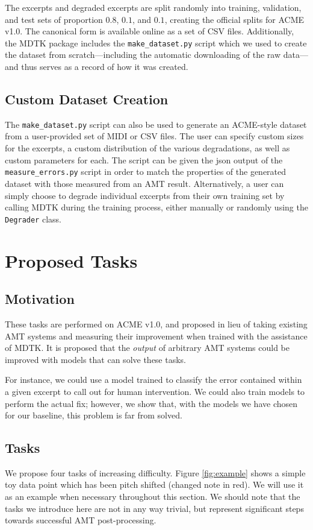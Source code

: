 \documentclass{article}
\begin{document}
The excerpts and degraded excerpts are split randomly into training, validation, and test sets of proportion $0.8$, $0.1$, and $0.1$, creating the official splits for ACME v1.0. The canonical form is available online as a set of CSV files. Additionally, the MDTK package includes the \mbox{\texttt{make\_dataset.py}} script which we used to create the dataset from scratch---including the automatic downloading of the raw data---and thus serves as a record of how it was created.

\subsection{Custom Dataset Creation}
The \mbox{\texttt{make\_dataset.py}} script can also be used to generate an ACME-style dataset from a user-provided set of MIDI or CSV files. The user can specify custom sizes for the excerpts, a custom distribution of the various degradations, as well as custom parameters for each. The script can be given the json output of the \texttt{\mbox{measure_errors.py}} script in order to match the properties of the generated dataset with those measured from an AMT result. Alternatively, a user can simply choose to degrade individual excerpts from their own training set by calling MDTK during the training process, either manually or randomly using the \texttt{\mbox{Degrader}} class.

\section{Proposed Tasks}
\label{sec:tasks}

\subsection{Motivation}
These tasks are performed on ACME v1.0, and proposed in lieu of taking existing AMT systems and measuring their improvement when trained with the assistance of MDTK. It is proposed that the \textit{output} of arbitrary AMT systems could be improved with models that can solve these tasks.

For instance, we could use a model trained to classify the error contained within a given excerpt to call out for human intervention. We could also train models to perform the actual fix; however, we show that, with the models we have chosen for our baseline, this problem is far from solved.

\subsection{Tasks}
We propose four tasks of increasing difficulty. Figure \ref{fig:example} shows a simple toy data point which has been pitch shifted (changed note in red). We will use it as an example when necessary throughout this section. We should note that the tasks we introduce here are not in any way trivial, but represent significant steps towards successful AMT post-processing.
\end{document}

